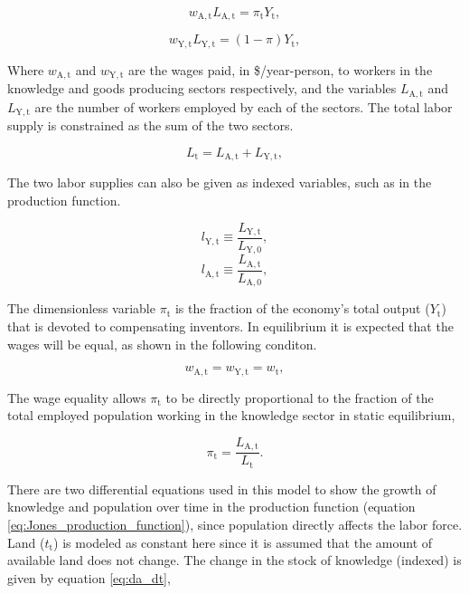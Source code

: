 \documentclass[letterpaper,12pt]{article}
\begin{document}
\begin{equation} \label{eq:knowledge_comp}
w_\mathrm{A,t} L_\mathrm{A,t} = \pi_\mathrm{t} Y_\mathrm{t},
\end{equation}

\begin{equation} \label{eq:labor_comp}
w_\mathrm{Y,t} L_\mathrm{Y,t} = (1-\pi) Y_\mathrm{t},
\end{equation}

Where $w_\mathrm{A,t}$ and $w_\mathrm{Y,t}$ are the wages paid, in \$/year-person, to workers in the knowledge and goods producing sectors respectively, and the variables $L_\mathrm{A,t}$ and $L_\mathrm{Y,t}$ are the number of workers employed by each of the sectors. The total labor supply is constrained as the sum of the two sectors.

\begin{equation} \label{labor_supply}
L_\mathrm{t} = L_\mathrm{A,t} + L_\mathrm{Y,t},
\end{equation}

The two labor supplies can also be given as indexed variables, such as in the production function.

\begin{equation}
l_\mathrm{Y,t} \equiv \frac{L_\mathrm{Y,t}}{L_\mathrm{Y,0}},
\end{equation}
\begin{equation}
l_\mathrm{A,t} \equiv \frac{L_\mathrm{A,t}}{L_\mathrm{A,0}},
\end{equation}

The dimensionless variable $\pi_\mathrm{t}$ is the fraction of the economy's total output ($Y_\mathrm{t}$) that is devoted to compensating inventors. In equilibrium it is expected that the wages will be equal, as shown in the following conditon.

\begin{equation} \label{eq:wage_equality}
w_\mathrm{A,t} = w_\mathrm{Y,t} = w_\mathrm{t},
\end{equation}

The wage equality allows $\pi_\mathrm{t}$ to be directly proportional to the fraction of the total employed population working in the knowledge sector in static equilibrium,

\begin{equation} \label{eq:pi}
\pi_\mathrm{t} = \frac{L_\mathrm{A,t}}{L_\mathrm{t}}.
\end{equation}

There are two differential equations used in this model to show the growth of knowledge and population over time in the production function (equation \ref{eq:Jones_production_function}), since population directly affects the labor force. Land ($t_\mathrm{t}$) is modeled as constant here since it is assumed that the amount of available land does not change. The change in the stock of knowledge (indexed) is given by equation \ref{eq:da_dt},
\end{document}
